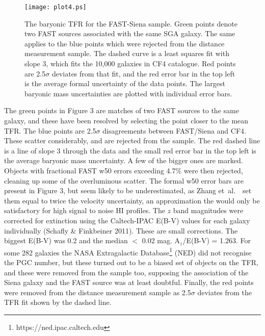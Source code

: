 \documentclass{article}
\newcommand{\etal}{\mbox{\rm{et al.}~~}}
\begin{document}
\begin{figure}	
\texttt{[image: plot4.ps]}
\caption{The baryonic TFR for the FAST-Siena sample. Green points denote two FAST sources associated with the same SGA galaxy. The same applies to the blue points which were rejected from the distance measurement sample. The dashed curve is a least squares fit with slope 3, which fits the 10,000 galaxies in CF4 catalogue. Red points are 2.5$\sigma$ deviates from that fit, and the red error bar in the top left is the average formal uncertainty of the data points. The largest baryonic mass uncertainties are plotted with individual error bars.}
\end{figure}
The green points in Figure 3 are matches of two FAST sources to the same galaxy, and these have been resolved by selecting the point closer to the mean TFR.  The blue points are 2.5$\sigma$ disagreements between FAST/Siena and CF4. These scatter considerably, and are rejected from the sample.
The red dashed line is a line of slope 3 through the data and the small red error bar in the top left is the average baryonic mass uncertainty. A few of the bigger ones are marked. Objects with fractional FAST w50 errors exceeding  4.7\% were then rejected, cleaning up some of the overluminous scatter. The formal w50 error bars are present in Figure 3, but seem likely to be underestimated, as Zhang \etal set them equal to twice the velocity uncertainty, an approximation the would only be satisfactory for high signal to noise HI profiles.
The $z$ band magnitudes were corrected for extinction using the Caltech-IPAC E(B-V) values for each galaxy individually (Schafly \& Finkbeiner 2011). These are small corrections. The biggest E(B-V) was 0.2 and the median $<$ 0.02 mag. A$_z$/E(B-V) = 1.263. For some 282 galaxies the NASA Extragalactic Database\footnote{https://ned.ipac.caltech.edu} (NED) did not recognise the PGC number, but these turned out to be a biased set of objects on the TFR, and these were removed from the sample too, supposing the association of the Siena galaxy and the FAST source was at least doubtful.
Finally, the red points were removed from the distance measurement sample as 2.5$\sigma$ deviates from the TFR fit shown by the dashed line.
\end{document}
